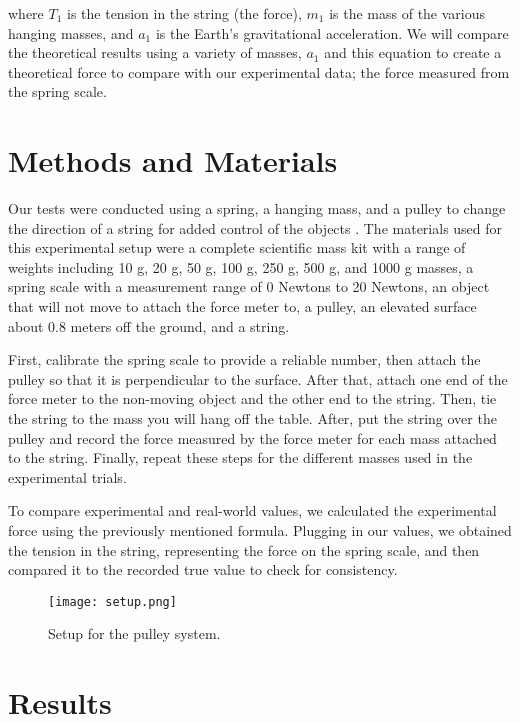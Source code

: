 \documentclass[aps, prl, twocolumn, 10pt]{revtex4-2}
\begin{document}
        where \( T_1 \) is the tension in the string (the force), \( m_1 \) is the mass of the various hanging masses, and \( a_1 \) is the Earth's gravitational acceleration. We will compare the theoretical results using a variety of masses, \( a_1 \) and this equation to create a theoretical force to compare with our experimental data; the force measured from the spring scale.
    
    \section*{Methods and Materials}
        \hrulefill
        
        Our tests were conducted using a spring, a hanging mass, and a pulley to change the direction of a string for added control of the objects . The materials used for this experimental setup were a complete scientific mass kit with a range of weights including 10 g, 20 g, 50 g, 100 g, 250 g, 500 g, and 1000 g masses, a spring scale with a measurement range of 0 Newtons to 20 Newtons, an object that will not move to attach the force meter to, a pulley, an elevated surface about 0.8 meters off the ground, and a string.
        
        First, calibrate the spring scale to provide a reliable number, then attach the pulley so that it is perpendicular to the surface. After that, attach one end of the force meter to the non-moving object and the other end to the string. Then, tie the string to the mass you will hang off the table. After, put the string over the pulley and record the force measured by the force meter for each mass attached to the string. Finally, repeat these steps for the different masses used in the experimental trials.
        
        To compare experimental and real-world values, we calculated the experimental force using the previously mentioned formula. Plugging in our values, we obtained the tension in the string, representing the force on the spring scale, and then compared it to the recorded true value to check for consistency. 
        
        \vspace{-1.5em}
        \begin{figure}[H]
            \centering
            \texttt{[image: setup.png]}
            \caption{Setup for the pulley system.}
            \label{fig:setup}
        \end{figure}
    
    \section*{Results}
        \hrulefill
        
\end{document}
